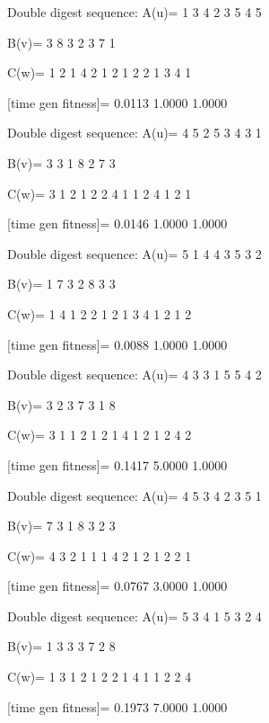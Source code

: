 Double digest sequence:
A(u)=
     1     3     4     2     3     5     4     5

B(v)=
     3     8     3     2     3     7     1

C(w)=
     1     2     1     4     2     1     2     1     2     2     1     3     4     1

[time gen fitness]=
    0.0113    1.0000    1.0000

Double digest sequence:
A(u)=
     4     5     2     5     3     4     3     1

B(v)=
     3     3     1     8     2     7     3

C(w)=
     3     1     2     1     2     2     4     1     1     2     4     1     2     1

[time gen fitness]=
    0.0146    1.0000    1.0000

Double digest sequence:
A(u)=
     5     1     4     4     3     5     3     2

B(v)=
     1     7     3     2     8     3     3

C(w)=
     1     4     1     2     2     1     2     1     3     4     1     2     1     2

[time gen fitness]=
    0.0088    1.0000    1.0000

Double digest sequence:
A(u)=
     4     3     3     1     5     5     4     2

B(v)=
     3     2     3     7     3     1     8

C(w)=
     3     1     1     2     1     2     1     4     1     2     1     2     4     2

[time gen fitness]=
    0.1417    5.0000    1.0000

Double digest sequence:
A(u)=
     4     5     3     4     2     3     5     1

B(v)=
     7     3     1     8     3     2     3

C(w)=
     4     3     2     1     1     1     4     2     1     2     1     2     2     1

[time gen fitness]=
    0.0767    3.0000    1.0000

Double digest sequence:
A(u)=
     5     3     4     1     5     3     2     4

B(v)=
     1     3     3     3     7     2     8

C(w)=
     1     3     1     2     1     2     2     1     4     1     1     2     2     4

[time gen fitness]=
    0.1973    7.0000    1.0000


